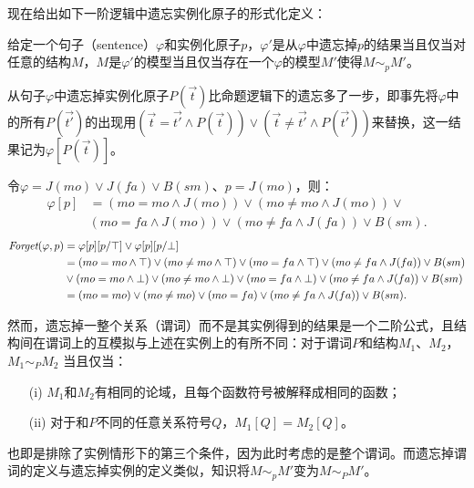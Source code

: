 现在给出如下一阶逻辑中遗忘实例化原子的形式化定义：
\begin{definition}\label{def:fol_fogetting}
	给定一个句子（sentence）$\varphi$和实例化原子$p$，$\varphi'$是从$\varphi$中遗忘掉$p$的结果当且仅当对任意的结构$M$，$M$是$\varphi'$的模型当且仅当存在一个$\varphi$的模型$M'$使得$M \sim_p M'$。
\end{definition}

从句子$\varphi$中遗忘掉实例化原子$P(\vec{t})$比命题逻辑下的遗忘多了一步，即事先将$\varphi$中的所有$P(\vec{t'})$的出现用$(\vec{t
} = \vec{t'}\wedge P(\vec{t})) \vee (\vec{t} \not= \vec{t'}\wedge P(\vec{t'}))$来替换，这一结果记为$\varphi[P(\vec{t})]$。

\begin{example}
	令$\varphi=J(mo) \vee J(fa) \vee B(sm)$、$p = J(mo)$，则：
	\begin{align*}
		\varphi[p] & = (mo = mo \wedge J(mo)) \vee (mo \not = mo \wedge J(mo)) \vee \\
		& (mo = fa \wedge J(mo)) \vee (mo \not = fa \wedge J(fa)) \vee B(sm).
	\end{align*}
	\begin{align*}
		\textit{Forget}(\varphi, p) & = \varphi[p][p/\top] \vee \varphi[p][p/\bot]\\
		& =  (mo = mo \wedge \top) \vee (mo \not = mo \wedge \top) \vee  (mo = fa \wedge \top) \vee (mo \not = fa \wedge J(fa)) \vee B(sm) \\
		&\vee (mo = mo \wedge \bot) \vee (mo \not = mo \wedge \bot) \vee  (mo = fa \wedge \bot) \vee (mo \not = fa \wedge J(fa)) \vee B(sm)\\
		& = (mo = mo )\vee (mo \not = mo) \vee  (mo = fa ) \vee  (mo \not = fa \wedge J(fa)) \vee B(sm).
	\end{align*}
\end{example}

然而，遗忘掉一整个关系（谓词）而不是其实例得到的结果是一个二阶公式，且结构间在谓词上的互模拟与上述在实例上的有所不同：对于谓词$P$和结构$M_1$、$M_2$，$M_1 \sim_{P} M_2$ 当且仅当：
\begin{itemize}
	\item[(i)] $M_1$和$M_2$有相同的论域，且每个函数符号被解释成相同的函数；
	\item[(ii)] 对于和$P$不同的任意关系符号$Q$，$M_1[Q]=M_2[Q]$。
\end{itemize}
也即是排除了实例情形下的第三个条件，因为此时考虑的是整个谓词。而遗忘掉谓词的定义与遗忘掉实例的定义类似，知识将$M \sim_p M'$变为$M \sim_P M'$。

